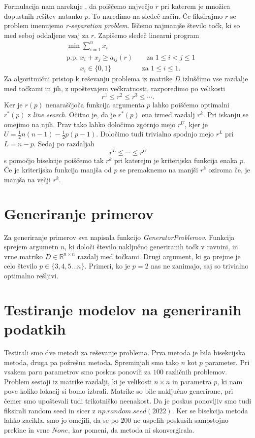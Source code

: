 \documentclass[a4paper]{article}
\begin{document}
Formulacija nam narekuje , da poiščemo največjo $ r $ pri katerem je množica dopustnih rešitev natanko $ p $.
To naredimo na sledeč način. Če fiksirajmo $ r $ se problem imenujemo \textit{r-separation problem}. Iščemo najmanjše število
točk, ki so med seboj oddaljene vsaj za $ r $. Zapišemo sledeč linearni program
\begin{align*}
    & \min \textstyle\sum_{i=1}^{n}x_i \\
    & \text{p.p. } x_i + x_j \geq a_{ij}(r) \qquad \text{za } 1 \leq i < j \leq 1 \\
    & \qquad x_i \in \{ 0,1 \} \,\;\qquad\qquad \text{za } 1 \leq i \leq 1.
\end{align*}
Za algoritmični pristop k reševanju problema iz matrike $ D $ izluščimo vse razdalje med točkami in jih, z
upoštevajem večkratnosti, razporedimo po velikosti
\[
	r^1 \leq r^2 \leq r^3 \leq \cdots .
\]
Ker je $ r(p) $ nenaraščjoča funkcija argumenta $ p $ lahko poiščemo optimalni $ r^*(p) $ z \textit{line search}.
Očitno je, da je $ r^*(p) $ ena izmed razdalj $ r^k $. Pri iskanju se omejimo na njih. Prav tako lahko določimo
zgornjo mejo $ r^U $, kjer je $ U = \frac{1}{2}n(n-1) - \frac{1}{2}p(p-1) $. Določimo tudi trivialno
spodnjo mejo $ r^L $ pri $ L = n - p $. Sedaj po razdaljah
\[
	r^L \leq \cdots \leq r^U
\]
s pomočjo bisekcije poiščemo tak $ r^k $ pri katerejm je kriterijska funkcija enaka $ p $.
Če je kriterijska funkcija manjša od $ p $ se premaknemo na manjši $ r^k $ oziroma če, je 
manjša na večji $ r^k $.

\section{Generiranje primerov}

Za generiranje primerov sva napisala funkcijo \textit{GeneratorProblemov}. Funkcija 
sprejem argumetn $ n $, ki določi število naključno generiranih točk v ravnini, in 
vrne matriko $ D \in \mathbb{R}^{n \times n} $ razdalj med točkami. Drugi argument, ki ga prejme
je celo število $ p \in \{ 3, 4, 5 \ldots n \} $. Primeri, ko je $ p = 2 $ nas ne
zanimajo, saj so trivialno optimalno rešljivi.

\section{Testiranje modelov na generiranih podatkih}

Testirali smo dve metodi za reševanje problema. Prva metoda je bila bisekcijska metoda, druga pa požrešna metoda. Spreminjali smo tako $n$ kot $p$ parameter. Pri vsakem paru parametrov smo poskus ponovili za $100$ različnih problemov. Problem sestoji iz matrike razdalji, ki je velikosti $n \times n$ in parametra $p$, ki nam pove koliko lokacij si bomo izbrali. Matrike so bile naključno generirane, pri čemer smo upoštevali tudi trikotniško neenakost. Da je poskus ponovljiv smo tudi fiksirali random seed in sicer z $np.random.seed(2022)$. Ker se bisekcija metoda lahko zacikla, smo jo omejili, da se po $200$ ne uspelih poskusih samostojno prekine in vrne $None$, kar pomeni, da metoda ni skonvergirala.
\end{document}
